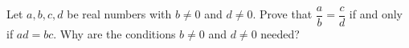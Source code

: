 Let $a,b,c,d$ be real numbers with $b\ne0$ and $d\ne0$. Prove that $\dfrac{a}{b}=\dfrac{c}{d}$ if and only if $ad=bc$. Why are the conditions $b\ne0$ and $d\ne0$ needed?
